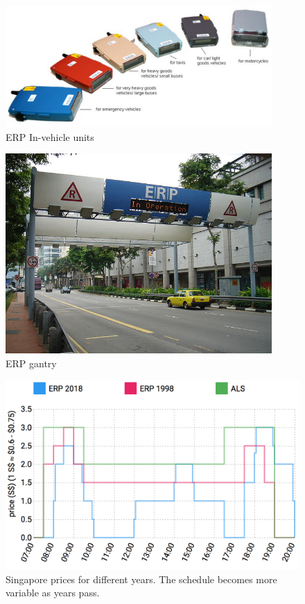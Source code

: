 \begin{figure}
	\includegraphics[width=4in]{../img/singapore-IUs.jpg}
	\caption{ERP In-vehicle units \citep{LTA2016}}
	\label{fig:singapore-IUs}
\end{figure}

\begin{figure}
	\includegraphics[width=4in]{../img/singapore-gantry.jpeg}
	\caption{ERP gantry \citep{LTA2016}}
	\label{fig:singapore-gantry}
\end{figure}


\begin{figure}
	\includegraphics[width=1\textwidth]{../img/singapore-prices.png}
	\caption{Singapore prices for different years. The schedule becomes more variable as years pass. }
	\label{fig:singapore-toll-schedule}
\end{figure}

